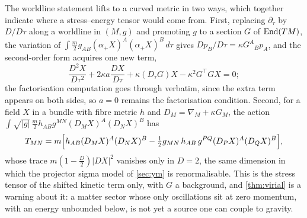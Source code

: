 The worldline statement lifts to a curved metric in two ways, which together indicate where a stress--energy tensor would come from.
First, replacing $\partial_\tau$ by $D/D\tau$ along a worldline in $(M,g)$ and promoting $g$ to a section $G$ of $\operatorname{End}(TM)$, the variation of
$\int\tfrac m2g_{AB}(\alpha_+X)^A(\alpha_+X)^B\,d\tau$ gives $Dp_B/D\tau=\kappa G^A{}_Bp_A$, and the second-order form acquires one new term,
\[
\frac{D^2X}{D\tau^2}+2\kappa a\frac{DX}{D\tau}+\kappa(D_\tau G)X-\kappa^2G^{\!\top}GX=0 ;
\]
the factorisation computation goes through verbatim, since the extra term appears on both sides, so $a=0$ remains the factorisation
condition. Second, for a field $X$ in a bundle with fibre metric $h$ and $D_M=\nabla_M+\kappa G_M$, the action
$\int\sqrt{|g|}\,\tfrac m2h_{AB}g^{MN}(D_MX)^A(D_NX)^B$ has
\[
T_{MN}=m\Bigl[h_{AB}(D_MX)^A(D_NX)^B-\tfrac12g_{MN}\,h_{AB}\,g^{PQ}(D_PX)^A(D_QX)^B\Bigr],
\]
whose trace $m(1-\tfrac D2)|DX|^2$ vanishes only in $D=2$, the same dimension in which the projector sigma model of \cref{sec:ym} is
renormalisable. This is the stress tensor of the shifted kinetic term only, with $G$ a background, and \cref{thm:virial} is a warning about
it: a matter sector whose only oscillations sit at zero momentum, with an energy unbounded below, is not yet a source one can couple to
gravity.
